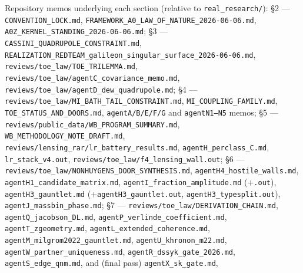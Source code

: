 \documentclass[11pt,a4paper]{article}
\begin{document}
\begin{itemize}
\end{itemize}

Repository memos underlying each section (relative to \texttt{real\_\allowbreak{}research/\allowbreak{}}): \S{}2 --- \texttt{CONVENTION\_\allowbreak{}LOCK.md}, \texttt{FRAMEWORK\_\allowbreak{}A0\_\allowbreak{}LAW\_\allowbreak{}OF\_\allowbreak{}NATURE\_\allowbreak{}2026-06-06.md}, \texttt{A0Z\_\allowbreak{}KERNEL\_\allowbreak{}STANDING\_\allowbreak{}2026-06-06.md}; \S{}3 --- \texttt{CASSINI\_\allowbreak{}QUADRUPOLE\_\allowbreak{}CONSTRAINT.md}, \texttt{REALIZATION\_\allowbreak{}REDTEAM\_\allowbreak{}galileon\_\allowbreak{}singular\_\allowbreak{}surface\_\allowbreak{}2026-06-06.md}, \texttt{reviews/\allowbreak{}toe\_\allowbreak{}law/\allowbreak{}TOE\_\allowbreak{}TRILEMMA.md}, \texttt{reviews/\allowbreak{}toe\_\allowbreak{}law/\allowbreak{}agentC\_\allowbreak{}covariance\_\allowbreak{}memo.md}, \texttt{reviews/\allowbreak{}toe\_\allowbreak{}law/\allowbreak{}agentD\_\allowbreak{}dew\_\allowbreak{}quadrupole.md}; \S{}4 --- \texttt{reviews/\allowbreak{}toe\_\allowbreak{}law/\allowbreak{}MI\_\allowbreak{}BATH\_\allowbreak{}TAIL\_\allowbreak{}CONSTRAINT.md}, \texttt{MI\_\allowbreak{}COUPLING\_\allowbreak{}FAMILY.md}, \texttt{TOE\_\allowbreak{}STATUS\_\allowbreak{}AND\_\allowbreak{}DOORS.md}, \texttt{agentA/\allowbreak{}B/\allowbreak{}E/\allowbreak{}F/\allowbreak{}G} and \texttt{agentN1--N5} memos; \S{}5 --- \texttt{reviews/\allowbreak{}public\_\allowbreak{}data/\allowbreak{}WB\_\allowbreak{}PROGRAM\_\allowbreak{}SUMMARY.md}, \texttt{WB\_\allowbreak{}METHODOLOGY\_\allowbreak{}NOTE\_\allowbreak{}DRAFT.md}, \texttt{reviews/\allowbreak{}lensing\_\allowbreak{}rar/\allowbreak{}lr\_\allowbreak{}battery\_\allowbreak{}results.md}, \texttt{agentH\_\allowbreak{}perclass\_\allowbreak{}C.md}, \texttt{lr\_\allowbreak{}stack\_\allowbreak{}v4.out}, \texttt{reviews/\allowbreak{}toe\_\allowbreak{}law/\allowbreak{}f4\_\allowbreak{}lensing\_\allowbreak{}wall.out}; \S{}6 --- \texttt{reviews/\allowbreak{}toe\_\allowbreak{}law/\allowbreak{}NONHUYGENS\_\allowbreak{}DOOR\_\allowbreak{}SYNTHESIS.md}, \texttt{agentH4\_\allowbreak{}hostile\_\allowbreak{}walls.md}, \texttt{agentH1\_\allowbreak{}candidate\_\allowbreak{}matrix.md}, \texttt{agentI\_\allowbreak{}fraction\_\allowbreak{}amplitude.md} (+\texttt{.out}), \texttt{agentH3\_\allowbreak{}gauntlet.md} (+\texttt{agentH3\_\allowbreak{}gauntlet.out}, \texttt{agentH3\_\allowbreak{}typesplit.out}), \texttt{agentJ\_\allowbreak{}massbin\_\allowbreak{}phase.md}; \S{}7 --- \texttt{reviews/\allowbreak{}toe\_\allowbreak{}law/\allowbreak{}DERIVATION\_\allowbreak{}CHAIN.md}, \texttt{agentQ\_\allowbreak{}jacobson\_\allowbreak{}DL.md}, \texttt{agentP\_\allowbreak{}verlinde\_\allowbreak{}coefficient.md}, \texttt{agentT\_\allowbreak{}zgeometry.md}, \texttt{agentL\_\allowbreak{}extended\_\allowbreak{}coherence.md}, \texttt{agentM\_\allowbreak{}milgrom2022\_\allowbreak{}gauntlet.md}, \texttt{agentU\_\allowbreak{}khronon\_\allowbreak{}m22.md}, \texttt{agentW\_\allowbreak{}partner\_\allowbreak{}uniqueness.md}, \texttt{agentR\_\allowbreak{}dssyk\_\allowbreak{}gate\_\allowbreak{}2026.md}, \texttt{agentS\_\allowbreak{}edge\_\allowbreak{}qnm.md}, and (final pass) \texttt{agentX\_\allowbreak{}sk\_\allowbreak{}gate.md}, 
\end{document}
